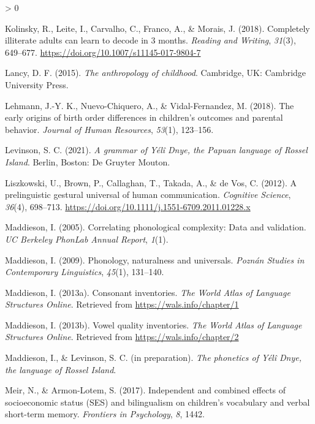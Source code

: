 \documentclass[
  american,
  ,man,floatsintext]{apa6}
\newlength{\cslhangindent}
\newenvironment{CSLReferences}[2] %
 {%
  \setlength{\parindent}{0pt}
  \ifodd #1 \everypar{\setlength{\hangindent}{\cslhangindent}}\ignorespaces\fi
  \ifnum #2 > 0
  \setlength{\parskip}{#2\baselineskip}
  \fi
 }%
 {}
\begin{document}
\begin{CSLReferences}{1}{0}
\leavevmode\hypertarget{ref-kolinsky2018completely}{}%
Kolinsky, R., Leite, I., Carvalho, C., Franco, A., \& Morais, J. (2018). Completely illiterate adults can learn to decode in 3 months. \emph{Reading and Writing}, \emph{31}(3), 649--677. \url{https://doi.org/10.1007/s11145-017-9804-7}

\leavevmode\hypertarget{ref-lancy2015anthropology}{}%
Lancy, D. F. (2015). \emph{The anthropology of childhood}. Cambridge, UK: Cambridge University Press.

\leavevmode\hypertarget{ref-lehmann2018early}{}%
Lehmann, J.-Y. K., Nuevo-Chiquero, A., \& Vidal-Fernandez, M. (2018). The early origins of birth order differences in children's outcomes and parental behavior. \emph{Journal of Human Resources}, \emph{53}(1), 123--156.

\leavevmode\hypertarget{ref-levinsonYDgrammar}{}%
Levinson, S. C. (2021). \emph{A grammar of {Yélî D}nye, the {P}apuan language of {R}ossel {I}sland}. Berlin, Boston: De Gruyter Mouton.

\leavevmode\hypertarget{ref-liszkowski2012prelinguistic}{}%
Liszkowski, U., Brown, P., Callaghan, T., Takada, A., \& de Vos, C. (2012). A prelinguistic gestural universal of human communication. \emph{Cognitive Science}, \emph{36}(4), 698--713. \url{https://doi.org/10.1111/j.1551-6709.2011.01228.x}

\leavevmode\hypertarget{ref-maddieson2005correlating}{}%
Maddieson, I. (2005). Correlating phonological complexity: Data and validation. \emph{UC Berkeley PhonLab Annual Report}, \emph{1}(1).

\leavevmode\hypertarget{ref-maddieson2009phonology}{}%
Maddieson, I. (2009). Phonology, naturalness and universals. \emph{Pozn{á}n Studies in Contemporary Linguistics}, \emph{45}(1), 131--140.

\leavevmode\hypertarget{ref-maddieson2013consonant}{}%
Maddieson, I. (2013a). Consonant inventories. \emph{The World Atlas of Language Structures Online}. Retrieved from \url{https://wals.info/chapter/1}

\leavevmode\hypertarget{ref-maddieson2013vowel}{}%
Maddieson, I. (2013b). Vowel quality inventories. \emph{The World Atlas of Language Structures Online}. Retrieved from \url{https://wals.info/chapter/2}

\leavevmode\hypertarget{ref-maddiesonIPphoneticsYD}{}%
Maddieson, I., \& Levinson, S. C. (in preparation). \emph{The phonetics of {Yélî Dnye}, the language of {Rossel Island}}.

\leavevmode\hypertarget{ref-meir2017independent}{}%
Meir, N., \& Armon-Lotem, S. (2017). Independent and combined effects of socioeconomic status ({SES}) and bilingualism on children's vocabulary and verbal short-term memory. \emph{Frontiers in Psychology}, \emph{8}, 1442.


\end{CSLReferences}
\end{document}
